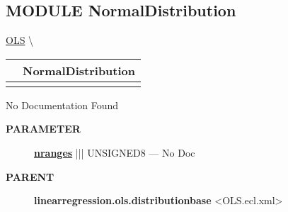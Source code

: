 \subsection*{\textsf{\colorbox{headtoc}{\color{white} MODULE}
NormalDistribution}}

\hypertarget{ecldoc:linearregression.ols.normaldistribution}{}
\hspace{0pt} \hyperlink{ecldoc:linearregression.ols}{OLS} \textbackslash 

{\renewcommand{\arraystretch}{1.5}
\begin{tabularx}{\textwidth}{|>{\raggedright\arraybackslash}l|X|}
\hline
\hspace{0pt}\mytexttt{\color{red} } & \textbf{NormalDistribution} \\
\hline
\multicolumn{2}{|>{\raggedright\arraybackslash}X|}{\hspace{0pt}\mytexttt{\color{param} (t\_Count NRanges)}} \\
\hline
\end{tabularx}
}

\par





No Documentation Found






\par
\begin{description}
\item [\colorbox{tagtype}{\color{white} \textbf{\textsf{PARAMETER}}}] \textbf{\underline{nranges}} ||| UNSIGNED8 --- No Doc
\end{description}









\par
\begin{description}
\item [\colorbox{tagtype}{\color{white} \textbf{\textsf{PARENT}}}] \textbf{linearregression.ols.distributionbase} <OLS.ecl.xml>
\end{description}


